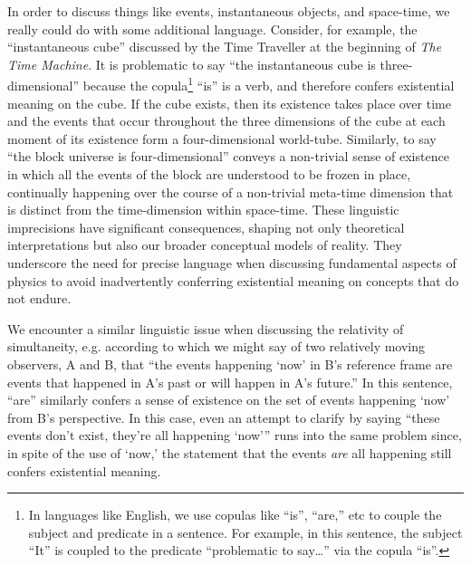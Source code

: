 \documentclass[aps,rmp,groupedaddress,twocolumn,10pt]{revtex4-2}
\begin{document}
In order to discuss things like events, instantaneous objects, and space-time, we really could do with some additional language. Consider, for example, the ``instantaneous cube'' discussed by the Time Traveller at the beginning of \textit{The Time Machine}. It is problematic to say ``the instantaneous cube is three-dimensional'' because the copula\footnote{In languages like English, we use copulas like ``is'', ``are,'' etc to couple the subject and predicate in a sentence. For example, in this sentence, the subject ``It'' is coupled to the predicate ``problematic to say\ldots'' via the copula ``is''.} ``is'' is a verb, and therefore confers existential meaning on the cube. If the cube exists, then its existence takes place over time and the events that occur throughout the three dimensions of the cube at each moment of its existence form a four-dimensional world-tube. Similarly, to say ``the block universe is four-dimensional'' conveys a non-trivial sense of existence in which all the events of the block are understood to be frozen in place, continually happening over the course of a non-trivial meta-time dimension that is distinct from the time-dimension within space-time. These linguistic imprecisions have significant consequences, shaping not only theoretical interpretations but also our broader conceptual models of reality. They underscore the need for precise language when discussing fundamental aspects of physics to avoid inadvertently conferring existential meaning on concepts that do not endure.

We encounter a similar linguistic issue when discussing the relativity of simultaneity, e.g. according to which we might say of two relatively moving observers, A and B, that ``the events happening `now' in B's reference frame are events that happened in A's past or will happen in A's future.'' In this sentence, ``are'' similarly confers a sense of existence on the set of events happening `now' from B's perspective. In this case, even an attempt to clarify by saying ``these events don't exist, they're all happening `now'{''} runs into the same problem since, in spite of the use of `now,' the statement that the events \textit{are} all happening still confers existential meaning.
\end{document}
